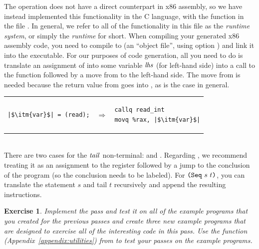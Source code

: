 \documentclass[11pt]{book}
\newtheorem{exercise}[theorem]{Exercise}
\begin{document}
The  operation does not have a direct counterpart in x86
assembly, so we have instead implemented this functionality in the C
language, with the function  in the file
. In general, we refer to all of the functionality in
this file as the \emph{runtime system}, or simply the \emph{runtime}
for short. When compiling your generated x86 assembly code, you need
to compile  to  (an ``object file'',
using  option ) and link it into the
executable. For our purposes of code generation, all you need to do is
translate an assignment of  into some variable $\mathit{lhs}$
(for left-hand side) into a call to the  function
followed by a move from  to the left-hand side.  The move
from  is needed because the return value from
 goes into , as is the case in general.  \\
\begin{tabular}{lll}
\begin{minipage}{0.3\textwidth}
\begin{lstlisting}
|$\itm{var}$| = (read);
\end{lstlisting}
\end{minipage}
&
$\Rightarrow$
&
\begin{minipage}{0.3\textwidth}
\begin{lstlisting}
callq read_int
movq %rax, |$\itm{var}$|
\end{lstlisting}
\end{minipage}
\end{tabular} \\

There are two cases for the $\mathit{tail}$ non-terminal:  and
. Regarding , we recommend treating it as an
assignment to the  register followed by a jump to the
conclusion of the program (so the conclusion needs to be labeled).
For $\texttt{(Seq}~s~t\texttt{)}$, you can translate the statement $s$ and tail $t$
recursively and append the resulting instructions.

\begin{exercise}
\normalfont
Implement the  pass and test it on all of the
example programs that you created for the previous passes and create
three new example programs that are designed to exercise all of the
interesting code in this pass. Use the  function
(Appendix~\ref{appendix:utilities}) from  to test
your passes on the example programs.
\end{exercise}
\end{document}
